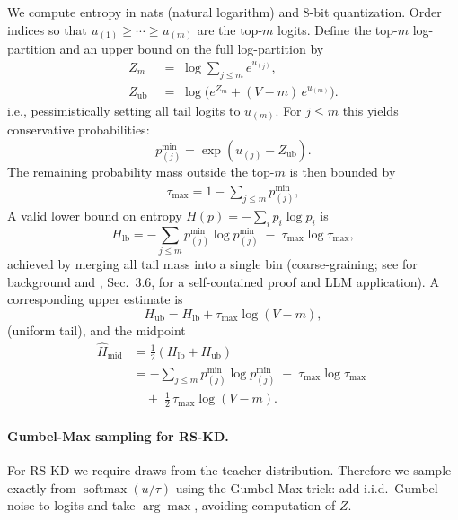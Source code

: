 \documentclass[11pt]{article}
\begin{document}
We compute entropy in nats (natural logarithm) and 8-bit quantization.
Order indices so that $u_{(1)} \geq \cdots \geq u_{(m)}$ are the top-$m$ logits.
Define the top-$m$ log-partition and an upper bound on the full log-partition by
\begin{align*}
	Z_m \;           & =\; \log \sum_{j \leq m} e^{u_{(j)}},           \\
	Z_{\text{ub}} \; & =\; \log\Big(e^{Z_m} + (V-m)\,e^{u_{(m)}}\Big).
\end{align*}
i.e., pessimistically setting all tail logits to $u_{(m)}$. For $j\le m$ this yields conservative probabilities:
\[
	p^{\min}_{(j)}=\exp(u_{(j)}-Z_{\text{ub}}).
\]
The remaining probability mass outside the top-$m$ is then bounded by
\begin{align*}
	\tau_{\max}=1-\sum_{j\le m}p^{\min}_{(j)},
\end{align*}
A valid lower bound on entropy $H(p)=-\sum_i p_i\log p_i$ is
\[
	H_{\text{lb}}=-\sum_{j\le m} p^{\min}_{(j)}\log p^{\min}_{(j)}\;-\;\tau_{\max}\log\tau_{\max},
\]
achieved by merging all tail mass into a single bin (coarse-graining; see \citep{cover2006elements} for background and \citep{kaltchenko2025entropyheatmap}, Sec.~3.6, for a self-contained proof and LLM application). A corresponding upper estimate is
\[
	H_{\text{ub}}=H_{\text{lb}}+\tau_{\max}\log(V-m),
\]
(uniform tail), and the midpoint
\begin{align*}
	\widehat{H}_{\text{mid}} & =\tfrac12\!\left(H_{\text{lb}}+H_{\text{ub}}\right)                                   \\
	                         & = -\sum_{j\le m}p^{\min}_{(j)}\log p^{\min}_{(j)} \;-\; \tau_{\max}\log\tau_{\max} \; \\
	                         & \quad +\; \tfrac12\,\tau_{\max}\log(V-m).
\end{align*}

\paragraph{Gumbel-Max sampling for RS-KD.}
For RS-KD we require draws from the teacher distribution.
Therefore we sample exactly from $\operatorname{softmax}(u/\tau)$ using the Gumbel-Max trick: add i.i.d.\ Gumbel noise to logits and take $\arg\max$, avoiding computation of $Z$.
\end{document}
